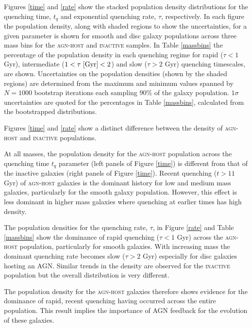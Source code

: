 \documentclass[useAMS,usenatbib]{mn2e}
\def\changed    {\color{nc} }
\def\secondchange    {\color{srv} }
\def\newref    {\color{new} }
\begin{document}
Figures \ref{time} and \ref{rate} show the stacked {\secondchange population density} distributions for the quenching time, $t_q$ and exponential quenching rate, $\tau$, respectively. In each figure the {\secondchange population density}, along with shaded regions to show the uncertainties, for a given parameter is shown for smooth and {\changed disc galaxy populations} across three mass bins for the \textsc{agn-host} and \textsc{inactive} samples. {\changed In Table \ref{massbins} the percentage of the {\secondchange population density} in each quenching regime} for rapid ($\tau < 1$ Gyr), intermediate ($1 < \tau ~\rm{[Gyr]} < 2$) and slow ($\tau > 2$ Gyr) quenching timescales, are shown. {\newref Uncertainties on the population densities (shown by the shaded regions) are determined from the maximum and minimum values spanned by $N = 1000$ bootstrap iterations each sampling $90\%$ of the galaxy population. $1\sigma$ uncertainties are quoted for the percentages in Table \ref{massbins}, calculated from the bootstrapped distributions.}

 {\changed Figures \ref{time} and \ref{rate} show} a distinct difference between the {\secondchange density} of \textsc{agn-host} and \textsc{inactive} populations.

At all masses, the {\secondchange population density} for the \textsc{agn-host} population across the quenching time $t_q$ parameter (left panels of Figure \ref{time}) is different from that of the inactive galaxies (right panels of Figure \ref{time}). Recent quenching ($t > 11$ Gyr) of \textsc{agn-host} galaxies is the dominant history for low and medium mass galaxies, particularly for the smooth galaxy population. However, this effect is less dominant in higher mass galaxies where quenching at earlier times has {\secondchange high density}.


The {\secondchange population densities} for the quenching rate, $\tau$, in Figure \ref{rate} and Table \ref{massbins} show the dominance of rapid quenching ($\tau < 1$ Gyr) across the \textsc{agn-host} population, particularly for smooth galaxies. With increasing mass the dominant quenching rate becomes slow ($\tau > 2$ Gyr) especially for disc galaxies hosting an AGN. Similar trends in the {\secondchange density} are observed for the \textsc{inactive} population but the overall distribution is very different. 


The {\secondchange population density} for the \textsc{agn-host} galaxies therefore shows evidence for the dominance of rapid, recent quenching having occurred across the entire population. This result implies the importance of AGN feedback for the evolution of these galaxies.
\end{document}
